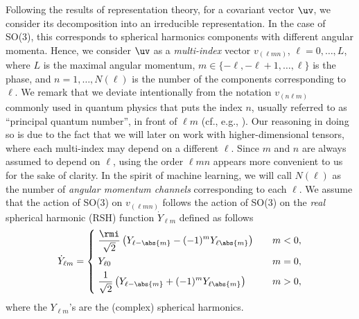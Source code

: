 Following the results of representation theory, for a covariant vector $\uv$, we consider its decomposition into an irreducible representation.
In the case of SO(3), this corresponds to spherical harmonics components with different angular momenta.
Hence, we consider $\uv$ as a \emph{multi-index} vector $v_{(\ell mn)}$, $\ell=0,\ldots,L$, where $L$ is the maximal angular momentum, $m\in\{-\ell,-\ell+1,\ldots,\ell\}$ is the phase, and $n=1,\ldots,N(\ell)$ is the number of the components corresponding to $\ell$.
We remark that we deviate intentionally from the notation $v_{(n\ell m)}$ commonly used in quantum physics that puts the index $n$, usually referred to as ``principal quantum number'', in front of $\ell m$ (cf., e.g., \citep{sakurai_modern_2020}).
Our reasoning in doing so is due to the fact that we will later on work with higher-dimensional tensors, where each multi-index may depend on a different $\ell$.
Since $m$ and $n$ are always assumed to depend on $\ell$, using the order $\ell mn$ appears more convenient to us for the sake of clarity.
In the spirit of machine learning, we will call $N(\ell)$ as the number of \emph{angular momentum channels} corresponding to each $\ell$.
We assume that the action of SO(3) on $v_{(\ell mn)}$ follows the action of SO(3) on the \emph{real} spherical harmonic (RSH) function $\dot Y_{\ell m}$ defined as follows
\begin{equation}\label{eq:real-sph}
    \dot Y_{\ell m} = \left\{
    \begin{aligned}
        \;& \frac{\rmi}{\sqrt{2}} \left( Y_{\ell -\abs{m}} - (-1)^m Y_{\ell\abs{m}} \right) &\quad& m<0, \\
        \;& Y_{\ell 0} && m=0, \\
        \;& \frac{1}{\sqrt{2}} \left( Y_{\ell-\abs{m}} + (-1)^m Y_{\ell\abs{m}} \right) && m>0,
    \end{aligned}
    \right.
\end{equation}
where the $Y_{\ell m}$'s are the (complex) spherical harmonics.

